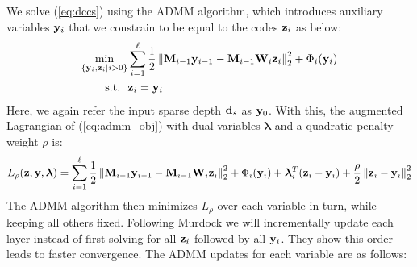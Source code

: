 We solve (\ref{eq:dccs}) using the ADMM algorithm, which introduces auxiliary variables $\mathbf{y}_i$ that we constrain to be equal to the codes $\mathbf{z}_i$ as below:
\begin{equation}
\begin{aligned}
\min_{\{\mathbf{y}_i, \mathbf{z}_i \vert i>0\}} & \sum_{i=1}^{\ell} \frac{1}{2} \left\Vert \mathbf{M}_{i-1}\mathbf{y}_{i-1} - \mathbf{M}_{i-1}\mathbf{W}_i\mathbf{z}_i\right\Vert_2^2 + \Phi_i(\mathbf{y}_i)\\
\text{s.t.~~} & \mathbf{z}_i = \mathbf{y}_i
\end{aligned}
\label{eq:admm_obj}
\end{equation}
Here, we again refer the input sparse depth $\mathbf{d}_s$ as $\mathbf{y}_0$. With this, the augmented Lagrangian of (\ref{eq:admm_obj}) with dual variables $\bm{\lambda}$ and a quadratic penalty weight $\rho$ is:
\begin{equation}
  L_\rho(\mathbf{z}, \mathbf{y}, \bm{\lambda}) = \sum_{i=1}^{\ell} \frac{1}{2} \left\Vert \mathbf{M}_{i-1}\mathbf{y}_{i-1} - \mathbf{M}_{i-1}\mathbf{W}_i\mathbf{z}_i\right\Vert_2^2 + \Phi_i(\mathbf{y}_i) + \bm{\lambda}^T_i(\mathbf{z}_i - \mathbf{y}_i) + \frac{\rho}{2}\left\Vert\mathbf{z}_i - \mathbf{y}_i\right\Vert_2^2
\end{equation}
The ADMM algorithm then minimizes $L_\rho$ over each variable in turn, while keeping all others fixed. Following Murdock \etal we will incrementally update each layer instead of first solving for all $\mathbf{z}_i$ followed by all $\mathbf{y}_i$. They show this order leads to faster convergence. The ADMM updates for each variable are as follows:

